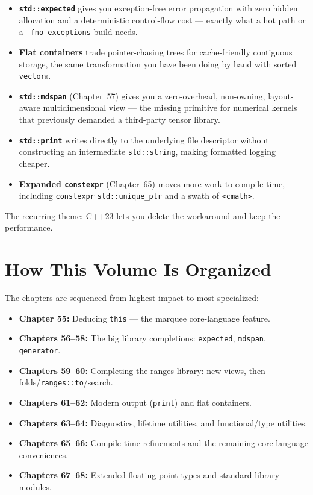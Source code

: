 \begin{itemize}
    \item \textbf{\lstinline|std::expected|} gives you exception-free error propagation with zero hidden allocation and a deterministic control-flow cost --- exactly what a hot path or a \lstinline|-fno-exceptions| build needs.
    \item \textbf{Flat containers} trade pointer-chasing trees for cache-friendly contiguous storage, the same transformation you have been doing by hand with sorted \lstinline|vector|s.
    \item \textbf{\lstinline|std::mdspan|} (Chapter~57) gives you a zero-overhead, non-owning, layout-aware multidimensional view --- the missing primitive for numerical kernels that previously demanded a third-party tensor library.
    \item \textbf{\lstinline|std::print|} writes directly to the underlying file descriptor without constructing an intermediate \lstinline|std::string|, making formatted logging cheaper.
    \item \textbf{Expanded \lstinline|constexpr|} (Chapter~65) moves more work to compile time, including \lstinline|constexpr| \lstinline|std::unique_ptr| and a swath of \lstinline|<cmath>|.
\end{itemize}

The recurring theme: C++23 lets you delete the workaround and keep the performance.

\section{How This Volume Is Organized}

The chapters are sequenced from highest-impact to most-specialized:

\begin{itemize}
    \item \textbf{Chapter 55:} Deducing \lstinline|this| --- the marquee core-language feature.
    \item \textbf{Chapters 56--58:} The big library completions: \lstinline|expected|, \lstinline|mdspan|, \lstinline|generator|.
    \item \textbf{Chapters 59--60:} Completing the ranges library: new views, then folds/\lstinline|ranges::to|/search.
    \item \textbf{Chapters 61--62:} Modern output (\lstinline|print|) and flat containers.
    \item \textbf{Chapters 63--64:} Diagnostics, lifetime utilities, and functional/type utilities.
    \item \textbf{Chapters 65--66:} Compile-time refinements and the remaining core-language conveniences.
    \item \textbf{Chapters 67--68:} Extended floating-point types and standard-library modules.
\end{itemize}


